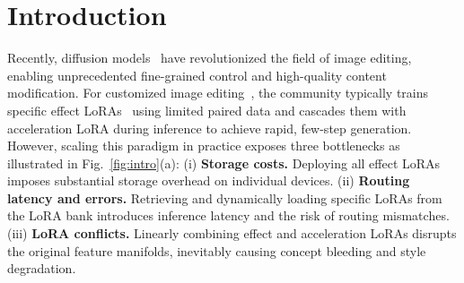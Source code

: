 \documentclass{llmxive}
\begin{document}
\section{Introduction}
\label{sec:intro}
Recently, diffusion models~\cite{flux2024,labs2025flux,flux-2-2025,qwenimage,sd1,esser2024scaling,peebles2023scalable} have revolutionized the field of image editing, enabling unprecedented fine-grained control and high-quality content modification. For customized image editing~\cite{mou2025dreamo,gal2022image,kumari2023multi,wu2025dcoardeepconceptinjection, Photodoodle,ye2023ip,zhang2023addingconditionalcontroltexttoimage,guo2025any2anytryon,zhang2025easycontrol,xie2023omnicontrol,huang2024incontextloradiffusiontransformers,liu2025llm4gen,she2025mosaic,liu2025tfcustom}, the community typically trains specific effect LoRAs~\cite{LoRA,huang2024incontextloradiffusiontransformers,OmniConsistency} using limited paired data and cascades them with acceleration LoRA during inference to achieve rapid, few-step generation. 
However, scaling this paradigm in practice exposes three bottlenecks as illustrated in Fig.~\ref{fig:intro}(a): (i) \textbf{Storage costs.} Deploying all effect LoRAs imposes substantial storage overhead on individual devices. (ii) \textbf{Routing latency and errors.} Retrieving and dynamically loading specific LoRAs from the LoRA bank introduces inference latency and the risk of routing mismatches. (iii) \textbf{LoRA conflicts.} Linearly combining effect and acceleration LoRAs disrupts the original feature manifolds, inevitably causing concept bleeding and style degradation.
\end{document}
